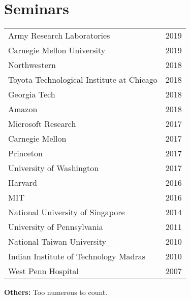 
\section{Seminars}
\begin{center}
\begin{tabularx}{\linewidth}{Xr}
Army Research Laboratories & 2019\\
Carnegie Mellon University & 2019\\
Northwestern & 2018\\
Toyota Technological Institute at Chicago & 2018\\
Georgia Tech & 2018\\
Amazon & 2018\\
Microsoft Research & 2017\\
Carnegie Mellon & 2017\\
Princeton & 2017\\
University of Washington & 2017\\
Harvard & 2016\\
MIT & 2016\\
National University of Singapore & 2014\\
University of Pennsylvania & 2011\\
National Taiwan University & 2010\\
Indian Institute of Technology Madras & 2010\\
West Penn Hospital & 2007
\end{tabularx}
\end{center}
\noindent \textbf{Others:} Too numerous to count.
